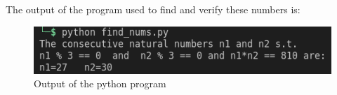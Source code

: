 \documentclass[journal, 11pt, twocolumn]{IEEEtran}
\begin{document}
    The output of the program used to find and verify these numbers is:
    \begin{figure}[h]
        \includegraphics[width=\columnwidth]{output.png}
        \caption{Output of the python program}
        \label{Fig2}
    \end{figure}
\end{document}
